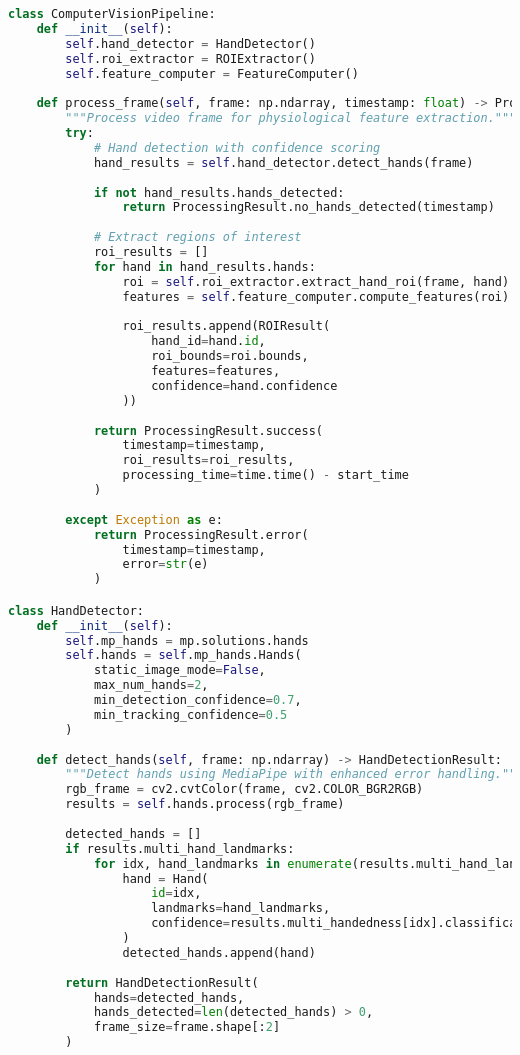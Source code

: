 \documentclass[11pt,a4paper]{report}
\begin{document}
\begin{lstlisting}[language=Python]
class ComputerVisionPipeline:
    def __init__(self):
        self.hand_detector = HandDetector()
        self.roi_extractor = ROIExtractor()
        self.feature_computer = FeatureComputer()
        
    def process_frame(self, frame: np.ndarray, timestamp: float) -> ProcessingResult:
        """Process video frame for physiological feature extraction."""
        try:
            # Hand detection with confidence scoring
            hand_results = self.hand_detector.detect_hands(frame)
            
            if not hand_results.hands_detected:
                return ProcessingResult.no_hands_detected(timestamp)
            
            # Extract regions of interest
            roi_results = []
            for hand in hand_results.hands:
                roi = self.roi_extractor.extract_hand_roi(frame, hand)
                features = self.feature_computer.compute_features(roi)
                
                roi_results.append(ROIResult(
                    hand_id=hand.id,
                    roi_bounds=roi.bounds,
                    features=features,
                    confidence=hand.confidence
                ))
            
            return ProcessingResult.success(
                timestamp=timestamp,
                roi_results=roi_results,
                processing_time=time.time() - start_time
            )
            
        except Exception as e:
            return ProcessingResult.error(
                timestamp=timestamp,
                error=str(e)
            )

class HandDetector:
    def __init__(self):
        self.mp_hands = mp.solutions.hands
        self.hands = self.mp_hands.Hands(
            static_image_mode=False,
            max_num_hands=2,
            min_detection_confidence=0.7,
            min_tracking_confidence=0.5
        )
    
    def detect_hands(self, frame: np.ndarray) -> HandDetectionResult:
        """Detect hands using MediaPipe with enhanced error handling."""
        rgb_frame = cv2.cvtColor(frame, cv2.COLOR_BGR2RGB)
        results = self.hands.process(rgb_frame)
        
        detected_hands = []
        if results.multi_hand_landmarks:
            for idx, hand_landmarks in enumerate(results.multi_hand_landmarks):
                hand = Hand(
                    id=idx,
                    landmarks=hand_landmarks,
                    confidence=results.multi_handedness[idx].classification[0].score
                )
                detected_hands.append(hand)
        
        return HandDetectionResult(
            hands=detected_hands,
            hands_detected=len(detected_hands) > 0,
            frame_size=frame.shape[:2]
        )
\end{lstlisting}
\end{document}
